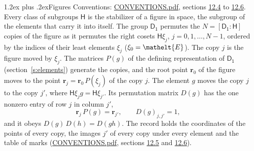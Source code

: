 \documentclass[10pt,a4paper]{article}
\makeatletter
\renewcommand\section{\@startsection{section}{1}{\z@}{-3ex plus -1ex minus -.2ex}%
  {1.2ex plus .2ex}{\normalfont\large\sffamily\bfseries\color{parttitle}}}
\numberwithin{equation}{section}
\newcommand{\eltfont}[1]{{\let\sigma\eltsigma\mathelt{#1}}}
\newcommand{\grp}[1]{\mathsf{#1}}
\newcommand{\cls}[1]{\eltfont{#1}}
\newcommand{\pointr}{\mathbf{r}}
\makeatother
\begin{document}
\section{Figures}\label{s:permutation}
Conventions: \href{../../CONVENTIONS.pdf}{CONVENTIONS.pdf}, sections \href{../../CONVENTIONS.pdf\#conv.12.4}{12.4} to \href{../../CONVENTIONS.pdf\#conv.12.6}{12.6}.
Every class of subgroups $\grp{H}$ is the stabilizer of a figure in space, the subgroup of the elements that carry it into itself. \label{n:local.orbit.size}\label{n:element.coset.least}\label{n:index.coset}The group $\grp{D_{1}}$ permutes the $N = [\grp{D_{1}} : \grp{H}]$ copies of the figure as it permutes the right cosets $\grp{H}\xi_j$, $j = 0, 1, \dots, N - 1$, ordered by the indices of their least elements $\xi_j$ ($\xi_0 = \cls{E}$). The copy $j$ is the figure moved by $\xi_j$. The matrices $P(g)$ of the defining representation of $\grp{D_{1}}$ (section~\ref{s:elements}) generate the copies, and the root point $\pointr_0$ of the figure moves to the point $\pointr_j = \pointr_0\, P(\xi_j)$ of the copy $j$. \label{n:local.coset.image}The element $g$ moves the copy $j$ to the copy $j'$, where $\grp{H}\xi_j g = \grp{H}\xi_{j'}$. \label{n:local.matrix.permutation}Its permutation matrix $D(g)$ has the one nonzero entry of row $j$ in column $j'$,
\begin{equation}\label{e:perm.matrix}\pointr_j\, P(g) = \pointr_{j'}, \qquad D(g)_{j,j'} = 1,\end{equation}
and it obeys $D(g)\, D(h) = D(gh)$. The record holds the coordinates of the points of every copy, the images $j'$ of every copy under every element and the table of marks (\href{../../CONVENTIONS.pdf}{CONVENTIONS.pdf}, sections \href{../../CONVENTIONS.pdf\#conv.12.5}{12.5} and \href{../../CONVENTIONS.pdf\#conv.12.6}{12.6}).
\end{document}

